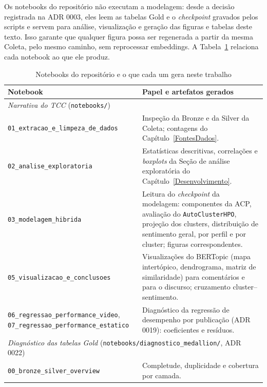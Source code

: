 Os notebooks do repositório não executam a modelagem: desde a decisão registrada na ADR 0003, eles leem as tabelas Gold e o \emph{checkpoint} gravados pelos scripts e servem para análise, visualização e geração das figuras e tabelas deste texto. Isso garante que qualquer figura possa ser regenerada a partir da mesma Coleta, pelo mesmo caminho, sem reprocessar embeddings. A Tabela~\ref{tab:notebooks} relaciona cada notebook ao que ele produz.

\begin{table}[htb]
\centering
\caption{Notebooks do repositório e o que cada um gera neste trabalho}
\label{tab:notebooks}
\small
\begin{tabular}{p{5.6cm}p{8.6cm}}
\toprule
\textbf{Notebook} & \textbf{Papel e artefatos gerados} \\
\midrule
\multicolumn{2}{l}{\emph{Narrativa do TCC} (\texttt{notebooks/})} \\
\texttt{01\_\allowbreak{}extracao\_\allowbreak{}e\_\allowbreak{}limpeza\_\allowbreak{}de\_\allowbreak{}dados} & Inspeção da Bronze e da Silver da Coleta; contagens do Capítulo~\ref{FontesDados}. \\
\texttt{02\_\allowbreak{}analise\_\allowbreak{}exploratoria} & Estatísticas descritivas, correlações e \emph{boxplots} da Seção de análise exploratória do Capítulo~\ref{Desenvolvimento}. \\
\texttt{03\_\allowbreak{}modelagem\_\allowbreak{}hibrida} & Leitura do \emph{checkpoint} da modelagem: componentes da ACP, avaliação do \texttt{AutoClusterHPO}, projeção dos clusters, distribuição de sentimento geral, por perfil e por cluster; figuras correspondentes. \\
\texttt{05\_\allowbreak{}visualizacao\_\allowbreak{}e\_\allowbreak{}conclusoes} & Visualizações do BERTopic (mapa intertópico, dendrograma, matriz de similaridade) para comentários e para o discurso; cruzamento cluster--sentimento. \\
\texttt{06\_\allowbreak{}regressao\_\allowbreak{}performance\_\allowbreak{}video}, \texttt{07\_\allowbreak{}regressao\_\allowbreak{}performance\_\allowbreak{}estatico} & Diagnóstico da regressão de desempenho por publicação (ADR 0019): coeficientes e resíduos. \\
\midrule
\multicolumn{2}{l}{\emph{Diagnóstico das tabelas Gold} (\texttt{notebooks/diagnostico\_\allowbreak{}medallion/}, ADR 0022)} \\
\texttt{00\_\allowbreak{}bronze\_\allowbreak{}silver\_\allowbreak{}overview} & Completude, duplicidade e cobertura por camada. \\

\end{tabular}
\end{table}
